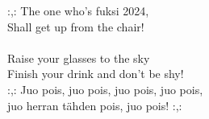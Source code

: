 
            :,: The one who's fuksi 2024, \\
            Shall get up from the chair! \\
\hspace{10mm} \\
            Raise your glasses to the sky \\
            Finish your drink and don't be shy! \\
            :,: Juo pois, juo pois, juo pois, juo pois,  \\
            juo herran tähden pois, juo pois! :,: \\
